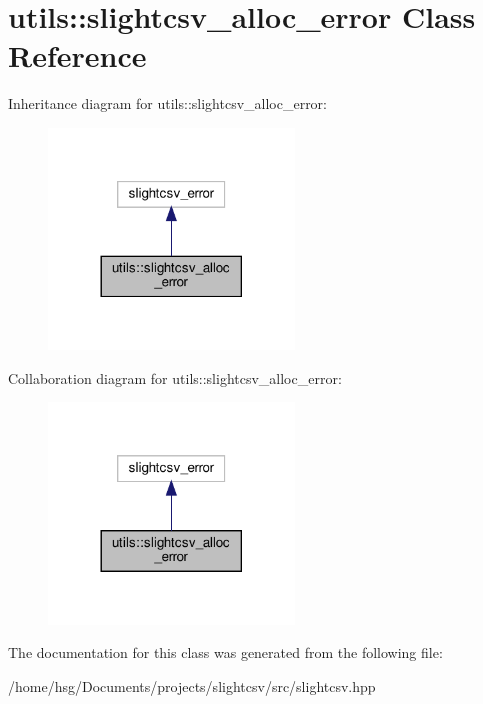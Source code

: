 \hypertarget{classutils_1_1slightcsv__alloc__error}{}\section{utils\+:\+:slightcsv\+\_\+alloc\+\_\+error Class Reference}
\label{classutils_1_1slightcsv__alloc__error}


Inheritance diagram for utils\+:\+:slightcsv\+\_\+alloc\+\_\+error\+:\nopagebreak
\begin{figure}[H]
\begin{center}
\leavevmode
\includegraphics[width=185pt]{classutils_1_1slightcsv__alloc__error__inherit__graph}
\end{center}
\end{figure}


Collaboration diagram for utils\+:\+:slightcsv\+\_\+alloc\+\_\+error\+:\nopagebreak
\begin{figure}[H]
\begin{center}
\leavevmode
\includegraphics[width=185pt]{classutils_1_1slightcsv__alloc__error__coll__graph}
\end{center}
\end{figure}


The documentation for this class was generated from the following file\+:\begin{DoxyCompactItemize}
\item 
/home/hsg/\+Documents/projects/slightcsv/src/slightcsv.\+hpp\end{DoxyCompactItemize}
